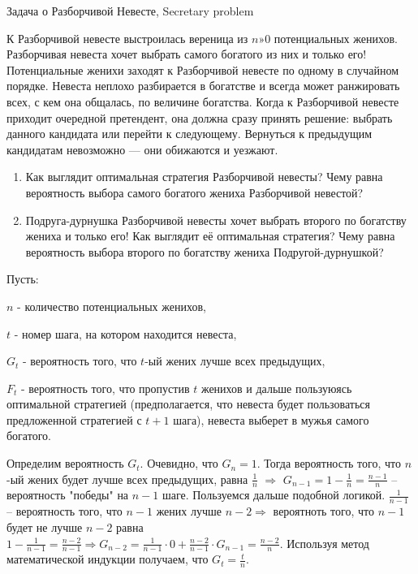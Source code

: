 \documentclass[nobib]{tufte-handout}
\theoremstyle{definition}
\newcounter{problem}
\newenvironment{problem}%
{%
\refstepcounter{problem}%
     \hypertarget{problem:{\theproblem}}{}
     \Writetofile{solution_file}{\protect\hypertarget{soln:\theproblem}{}}
     \begin{myenum}[label=\bfseries\protect\hyperlink{soln:\theproblem}{\theproblem},ref=\theproblem]
     \item%
    }%
    {%
    \end{myenum}}
\begin{document}
\begin{problem}
Задача о Разборчивой Невесте, Secretary problem

К Разборчивой невесте выстроилась вереница из $n»0$ потенциальных женихов.   Разборчивая невеста хочет выбрать самого богатого из них и только его! Потенциальные женихи заходят к Разборчивой невесте по одному в случайном порядке. Невеста неплохо разбирается в богатстве и всегда может ранжировать всех, с кем она общалась, по величине богатства. Когда к Разборчивой невесте приходит очередной претендент, она должна сразу принять решение: выбрать данного кандидата или перейти к следующему. Вернуться к предыдущим кандидатам невозможно — они обижаются и уезжают.

\begin{enumerate}
\item Как выглядит оптимальная стратегия Разборчивой невесты? Чему равна вероятность выбора самого богатого жениха Разборчивой невестой?
\item Подруга-дурнушка Разборчивой невесты хочет выбрать второго по богатству жениха и только его!  Как выглядит её оптимальная стратегия? Чему равна вероятность выбора второго по богатству жениха Подругой-дурнушкой?
\end{enumerate}

\begin{sol}
Пусть:

$n$ - количество потенциальных женихов,

$t$ - номер шага, на котором находится невеста,

$G_t$ - вероятность того, что $t$-ый жених лучше всех предыдущих,

$F_t$ - вероятность того, что пропустив $t$ женихов и дальше пользуюясь оптимальной
стратегией (предполагается, что невеста будет пользоваться предложенной стратегией с $t+1$
шага), невеста выберет в мужья самого богатого.

Определим вероятность $G_t$. Очевидно, что $G_n = 1$. Тогда вероятность того, что $n$-ый жених будет лучше всех предыдущих, равна  $\frac{1}{n}$ $\Rightarrow$ $G_{n-1}=1-\frac{1}{n}=\frac{n-1}{n}$ – вероятность "победы" на $n-1$ шаге. Пользуемся дальше подобной логикой. $\frac{1}{n-1}$ – вероятность того, что $n-1$ жених лучше $n-2\Rightarrow$ вероятноть того, что $n-1$ будет не лучше $n-2$ равна $1-\frac{1}{n-1}=\frac{n-2}{n-1}\Rightarrow G_{n-2}= \frac{1}{n-1}\cdot 0+\frac{n-2}{n-1}\cdot G_{n-1}=\frac{n-2}{n}$. Используя метод математической индукции получаем, что $G_t=\frac{t}{n}$.


\end{sol}
\end{problem}
\end{document}
